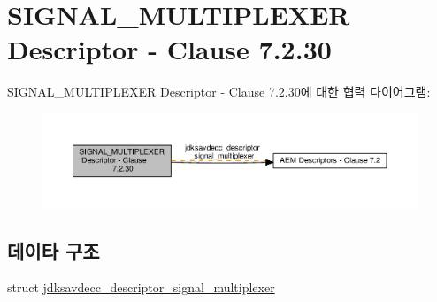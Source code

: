 \hypertarget{group__descriptor__signal__multiplexer}{}\section{S\+I\+G\+N\+A\+L\+\_\+\+M\+U\+L\+T\+I\+P\+L\+E\+X\+ER Descriptor -\/ Clause 7.2.30}
\label{group__descriptor__signal__multiplexer}
S\+I\+G\+N\+A\+L\+\_\+\+M\+U\+L\+T\+I\+P\+L\+E\+X\+ER Descriptor -\/ Clause 7.2.30에 대한 협력 다이어그램\+:
\nopagebreak
\begin{figure}[H]
\begin{center}
\leavevmode
\includegraphics[width=350pt]{group__descriptor__signal__multiplexer}
\end{center}
\end{figure}
\subsection*{데이타 구조}
\begin{DoxyCompactItemize}
\item 
struct \hyperlink{structjdksavdecc__descriptor__signal__multiplexer}{jdksavdecc\+\_\+descriptor\+\_\+signal\+\_\+multiplexer}
\end{DoxyCompactItemize}
